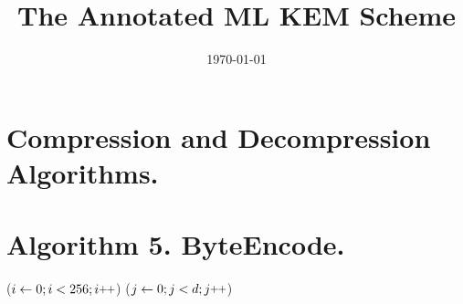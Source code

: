\documentclass[12pt]{article}
\title{The Annotated ML KEM Scheme\TwoPtSp {\large{Rejection Sampling in ML-KEM}}}
\date{\today}
\begin{document}
\maketitle

\newpage
\section{Compression and Decompression Algorithms.}
\begin{algorithm}[H]
\caption*{\textbf{Annotated Algorithm} $\Name{Compress}_d(x: \Zq) \rightarrow y:\ZTwoPowD $}
\begin{algorithmic}[1]


\end{algorithmic}
\end{algorithm}


\begin{algorithm}[H]
\caption*{\textbf{Annotated Algorithm} $\Name{Decompress}_d(y: \ZTwoPowD) \rightarrow x:\Zq $}
\begin{algorithmic}[1]


\end{algorithmic}
\end{algorithm}

\section{Algorithm 5. ByteEncode.}

\begin{algorithm}[H]
\caption*{\textbf{Annotated Algorithm 5} $\Name{ByteEncode}_d(F:\RingZm) \rightarrow B:\mathbb{B}^{32} $}

\begin{algorithmic}[1]
\vspace*{1pt}
\vspace*{1pt}
\For ($ i \is 0; i < 256; i\plusplus $)
        {}
    \For ($ j \is 0; j < d; j\plusplus $)
    \EndFor
\EndFor



\end{algorithmic}
\end{algorithm}
\end{document}
